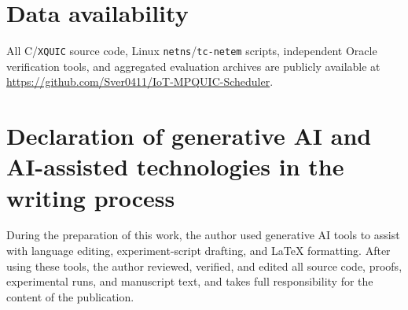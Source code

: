 \documentclass[preprint,12pt,number]{elsarticle}
\begin{document}
\section*{Data availability}
All C/\texttt{XQUIC} source code, Linux \texttt{netns}/\texttt{tc-netem} scripts, independent Oracle verification tools, and aggregated evaluation archives are publicly available at \url{https://github.com/Sver0411/IoT-MPQUIC-Scheduler}.

\section*{Declaration of generative AI and AI-assisted technologies in the writing process}
During the preparation of this work, the author used generative AI tools to assist with language editing, experiment-script drafting, and \LaTeX{} formatting. After using these tools, the author reviewed, verified, and edited all source code, proofs, experimental runs, and manuscript text, and takes full responsibility for the content of the publication.



\end{document}
